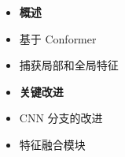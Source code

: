 \documentclass[CJK,aspectratio=169]{beamer}  %
\begin{document}
	\begin{frame}
		\begin{figure}
			\centering
			\begin{minipage}{.4\textwidth}
				\centering
				\small
				\begin{itemize} 
					\item \textbf{概述}
					
					\item[\checkmark]\small 基于 Conformer
					
					\item[\checkmark]\small 捕获局部和全局特征
					
				\end{itemize}
				\begin{itemize} 
					\item \textbf{关键改进}
					
					\item[\checkmark]\small CNN 分支的改进
					
					
					\item[\checkmark]\small 特征融合模块
					

\end{itemize}
\end{minipage}
\end{figure}
\end{frame}
\end{document}
